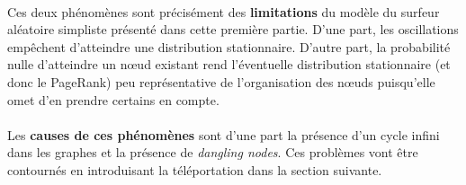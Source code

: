\documentclass[a4paper,titlepage]{report}
\begin{document}
\paragraph{}
Ces deux phénomènes sont précisément des \textbf{limitations} du modèle du surfeur aléatoire simpliste présenté dans cette première partie. D'une part, les oscillations empêchent d'atteindre une distribution stationnaire. D'autre part, la probabilité nulle d'atteindre un nœud existant rend l'éventuelle distribution stationnaire (et donc le PageRank) peu représentative de l'organisation des nœuds puisqu'elle omet d'en prendre certains en compte.
\paragraph{}
Les \textbf{causes de ces phénomènes} sont d'une part la présence d'un cycle infini dans les graphes et la présence de \textit{dangling nodes}. Ces problèmes vont être contournés en introduisant la téléportation dans la section suivante.
\end{document}
